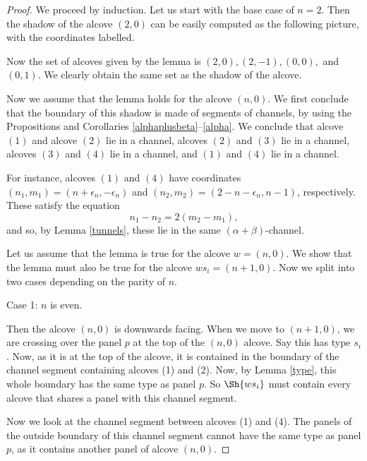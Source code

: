 \documentclass[11pt]{article}
\begin{document}
\begin{proof}
    We proceed by induction. Let us start with the base case of $n=2$. Then the shadow of the alcove $(2,0)$ can be easily computed as the following picture, with the coordinates labelled. 


\begin{center}
\resizebox{0.3\textwidth}{!}{}
\end{center}


     Now the set of alcoves given by the lemma is $(2,0), (2,-1), (0,0),$ and $(0,1)$. We clearly obtain the same set as the shadow of the alcove. 

     Now we assume that the lemma holds for the alcove $(n,0)$. We first conclude that the boundary of this shadow is made of segments of channels, by using the Propositions and Corollaries \ref{alphaplusbeta}--\ref{alpha}. We conclude that alcove $(1)$ and alcove $(2)$ lie in a channel, alcoves $(2)$ and $(3)$ lie in a channel, alcoves $(3)$ and $(4)$ lie in a channel, and $(1)$ and $(4)$ lie in a channel. 
     

     For instance, alcoves $(1)$ and $(4)$ have coordinates $(n_1,m_1)=(n+\epsilon_n,-\epsilon_n)$ and $(n_2,m_2)=(2-n-\epsilon_n,n-1)$, respectively. These satisfy the equation
     \[n_1-n_2=2(m_2-m_1),\]
     and so, by Lemma \ref{tunnels}, these lie in the same $(\alpha+\beta)$-channel. 


     
     Let us assume that the lemma is true for the alcove $w=(n,0)$. We show that the lemma must also be true for the alcove $ws_i=(n+1,0)$. Now we split into two cases depending on the parity of $n$.

     Case 1: $n$ is even. 

     
     Then the alcove $(n,0)$ is downwards facing. When we move to $(n+1,0)$, we are crossing over the panel $p$ at the top of the $(n,0)$ alcove. Say this has type $s_i$. Now, as it is at the top of the alcove, it is contained in the boundary of the channel segment containing alcoves (1) and (2). Now, by Lemma \ref{type}, this whole boundary has the same type as panel $p$. So $\Sh{ws_i}$ must contain every alcove that shares a panel with this channel segment. 

    Now we look at the channel segment between alcoves (1) and (4). The panels of the outside boundary of this channel segment cannot have the same type as panel $p$, as it contains another panel of alcove $(n,0)$. 


\end{proof}
\end{document}
